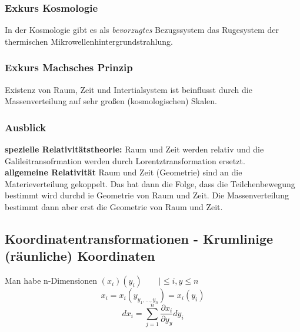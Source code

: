 \documentclass[11pt]{article}
\begin{document}
								\subsubsection{Exkurs Kosmologie}
									In der Kosmologie gibt es als \textit{bevorzugtes} Bezugssystem das Rugesystem der thermischen Mikrowellenhintergrundstrahlung.
									\subsubsection{Exkurs Machsches Prinzip}
										Existenz von Raum, Zeit und Intertialsystem ist beinflusst durch die Massenverteilung auf sehr großen (kosmologischen) Skalen.
									\subsubsection{Ausblick}
										\textbf{spezielle Relativitätstheorie:} Raum und Zeit werden relativ und die Galileitransofrmation werden durch Lorentztransformation ersetzt.\\
										\textbf{allgemeine Relativität}  Raum und Zeit (Geometrie) sind an die Materieverteilung gekoppelt. Das hat dann die Folge, dass die Teilchenbewegung bestimmt wird durchd ie Geometrie von Raum und Zeit. Die Massenverteilung bestimmt dann aber erst die Geometrie von Raum und Zeit.
							\subsection{Koordinatentransformationen - Krumlinige (räunliche) Koordinaten}
								Man habe n-Dimensionen $ (x_i) (y_i) \qquad |\leq i,y \leq n  $	
								\[ x_i = x_i(y_{y_1, ..., y_n}) = x_i(y_i) \]
								\[ dx_i = \sum_{j = 1}^{n} \frac{\partial x_i}{\partial y_y} dy_i \]
\end{document}

